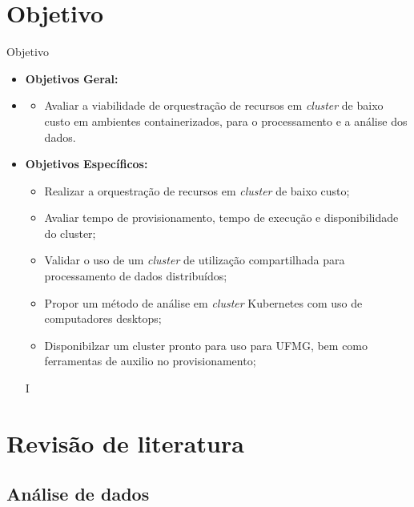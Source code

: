 \documentclass[10pt,brazil]{beamer}
\theoremstyle{definition}
\begin{document}
\section{Objetivo}
\begin{frame}[allowframebreaks]{Objetivo}
  \begin{itemize}
    \item[] \textbf{Objetivos Geral:}
    \item[]
          \begin{itemize}
            \item[] Avaliar a viabilidade de orquestração de recursos em \emph{cluster} de baixo custo em ambientes containerizados, para o processamento e a análise dos dados.
          \end{itemize}
    \item[] \textbf{Objetivos Específicos:}
          \begin{itemize}
            \item Realizar a orquestração de recursos em \emph{cluster} de baixo custo;
            \item Avaliar tempo de provisionamento, tempo de execução e disponibilidade do cluster;
            \item Validar o uso de um \emph{cluster} de utilização compartilhada para processamento de dados distribuídos;
            \item Propor um método de análise em \emph{cluster} Kubernetes com uso de computadores desktops;
            \item Disponibilzar um cluster pronto para uso para UFMG, bem como ferramentas de auxilio no provisionamento;
          \end{itemize}
          I\end{itemize}
\end{frame}


\section{Revisão de literatura}

\subsection{Análise de dados}
\end{document}

